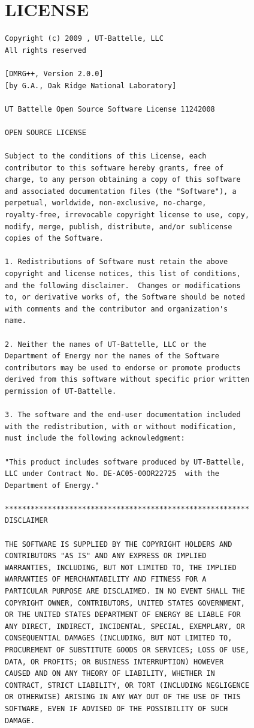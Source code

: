 \documentclass[paper=letter]{scrartcl}
\begin{document}
\section*{LICENSE}
\begin{Verbatim}
Copyright (c) 2009 , UT-Battelle, LLC
All rights reserved

[DMRG++, Version 2.0.0]
[by G.A., Oak Ridge National Laboratory]

UT Battelle Open Source Software License 11242008

OPEN SOURCE LICENSE

Subject to the conditions of this License, each
contributor to this software hereby grants, free of
charge, to any person obtaining a copy of this software
and associated documentation files (the "Software"), a
perpetual, worldwide, non-exclusive, no-charge,
royalty-free, irrevocable copyright license to use, copy,
modify, merge, publish, distribute, and/or sublicense
copies of the Software.

1. Redistributions of Software must retain the above
copyright and license notices, this list of conditions,
and the following disclaimer.  Changes or modifications
to, or derivative works of, the Software should be noted
with comments and the contributor and organization's
name.

2. Neither the names of UT-Battelle, LLC or the
Department of Energy nor the names of the Software
contributors may be used to endorse or promote products
derived from this software without specific prior written
permission of UT-Battelle.

3. The software and the end-user documentation included
with the redistribution, with or without modification,
must include the following acknowledgment:

"This product includes software produced by UT-Battelle,
LLC under Contract No. DE-AC05-00OR22725  with the
Department of Energy."
 
*********************************************************
DISCLAIMER

THE SOFTWARE IS SUPPLIED BY THE COPYRIGHT HOLDERS AND
CONTRIBUTORS "AS IS" AND ANY EXPRESS OR IMPLIED
WARRANTIES, INCLUDING, BUT NOT LIMITED TO, THE IMPLIED
WARRANTIES OF MERCHANTABILITY AND FITNESS FOR A
PARTICULAR PURPOSE ARE DISCLAIMED. IN NO EVENT SHALL THE
COPYRIGHT OWNER, CONTRIBUTORS, UNITED STATES GOVERNMENT,
OR THE UNITED STATES DEPARTMENT OF ENERGY BE LIABLE FOR
ANY DIRECT, INDIRECT, INCIDENTAL, SPECIAL, EXEMPLARY, OR
CONSEQUENTIAL DAMAGES (INCLUDING, BUT NOT LIMITED TO,
PROCUREMENT OF SUBSTITUTE GOODS OR SERVICES; LOSS OF USE,
DATA, OR PROFITS; OR BUSINESS INTERRUPTION) HOWEVER
CAUSED AND ON ANY THEORY OF LIABILITY, WHETHER IN
CONTRACT, STRICT LIABILITY, OR TORT (INCLUDING NEGLIGENCE
OR OTHERWISE) ARISING IN ANY WAY OUT OF THE USE OF THIS
SOFTWARE, EVEN IF ADVISED OF THE POSSIBILITY OF SUCH
DAMAGE.


\end{Verbatim}
\end{document}

